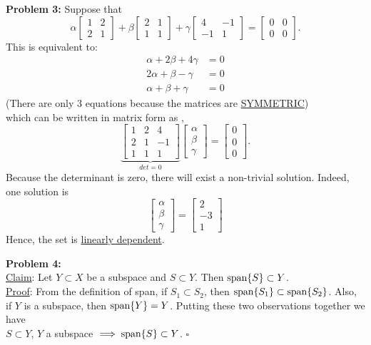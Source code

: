 \documentclass[letterpaper]{article}
\begin{document}
\noindent \textbf{Problem 3:} Suppose that
$$\alpha \left[\begin{array}{cc}1&2\\2&1\end{array}\right]+\beta \left[\begin{array}{cc}2&1\\1&1\end{array}\right]+\gamma \left[\begin{array}{cc}4&-1\\-1&1\end{array}\right]=\left[\begin{array}{cc}0&0\\0&0\end{array}\right].$$
This is equivalent to:
$$\begin{aligned}
\alpha+2\beta+4\gamma&=0\\
2\alpha+\beta-\gamma&=0\\
\alpha+\beta+\gamma&=0\end{aligned}$$
(There are only 3 equations because the matrices are \underline{SYMMETRIC})\\
which can be written in matrix form as ,
$$\underbrace{\left[ \begin{array}{ccc}1 & 2 & 4 \\ 2 & 1 & -1 \\ 1 & 1 & 1 \end{array} \right]}_{det=0 } \begin{bmatrix} \alpha \\ \beta \\ \gamma \end{bmatrix} = \begin{bmatrix} 0 \\ 0 \\ 0 \end{bmatrix}. $$
Because the determinant is zero, there will exist a non-trivial solution. Indeed, one solution is
$$\begin{bmatrix}
\alpha\\ \beta \\ \gamma
\end{bmatrix} = \begin{bmatrix}
2\\-3\\1
\end{bmatrix}$$
Hence, the set is \underline{linearly dependent}.
\bigskip

\noindent \textbf{Problem 4:}
\medskip \\
\underline{Claim}: Let $Y \subset X$ be a subspace and $S\subset Y$. Then $ \textrm{span} \{ S \}\subset Y$.
\medskip \\
\underline{Proof}: From the definition of span, if $S_1\subset S_2$, then $\textrm{span} \{ S_1 \}\subset\textrm{span} \{ S_2 \}$. Also, if $Y$ is a subspace, then $\textrm{span} \{ Y \}=Y$. Putting these two observations together we have\\
\null\hfill$S\subset Y$, $Y$ a subspace $\implies \textrm{span} \{ S \}\subset Y$. \hfill $\square$
\bigskip
\newpage
\end{document}
